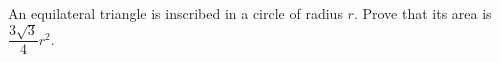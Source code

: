 An equilateral triangle is inscribed in a circle of radius $r$. Prove that its area is $\dfrac{3\sqrt3}{4}r^2$.
